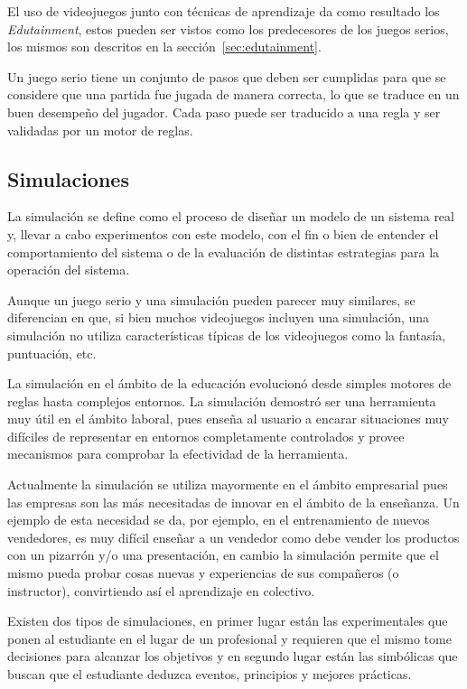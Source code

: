 El uso de videojuegos junto con técnicas de aprendizaje da como resultado los 
\emph{Edutainment}, estos pueden ser vistos como los predecesores de los juegos
serios, los mismos son descritos en la sección~\ref{sec:edutainment}.



Un juego serio tiene un conjunto de pasos que deben ser cumplidas para 
que se considere que una partida fue jugada de manera correcta, lo que se traduce 
en un buen desempeño del jugador. Cada paso puede ser traducido a una regla
y ser validadas por un motor de reglas. 

\subsection{Simulaciones}

La simulación se define como el proceso de diseñar un modelo de un sistema real
y, llevar a cabo experimentos con este modelo, con el fin o bien de entender el
comportamiento del sistema o de la evaluación de distintas estrategias para la
operación del sistema\cite{ingalls2008introduction}. 

Aunque un juego serio y una simulación pueden parecer muy similares, se
diferencian en que, si bien muchos videojuegos incluyen una simulación, una
simulación no utiliza características típicas de los videojuegos como la
fantasía, puntuación, etc\cite{sg:aoverview}.

La simulación en el ámbito de la educación evolucionó desde simples motores de
reglas hasta complejos entornos. La simulación demostró ser una herramienta muy
útil en el ámbito laboral\cite{guenaga2013serious}, pues enseña al usuario a
encarar situaciones muy difíciles de representar en entornos completamente
controlados y provee mecanismos para comprobar la efectividad de la herramienta. 

Actualmente la simulación se utiliza mayormente en el ámbito empresarial pues las
empresas son las más necesitadas de innovar en el ámbito de la enseñanza. Un
ejemplo de esta necesidad se da, por ejemplo, en el entrenamiento de nuevos
vendedores, es muy difícil enseñar a un vendedor como debe vender los productos
con un pizarrón y/o una presentación, en cambio la simulación permite que el
mismo pueda probar cosas nuevas y experiencias de sus compañeros (o instructor),
convirtiendo así el aprendizaje en colectivo\cite{guenaga2013serious}.

Existen dos tipos de simulaciones, en primer lugar están las experimentales que
ponen al estudiante en el lugar de un profesional y requieren que el mismo tome
decisiones para alcanzar los objetivos y en segundo lugar están las simbólicas
que buscan que el estudiante deduzca eventos, principios y mejores
prácticas\cite{charsky:2010}. 

